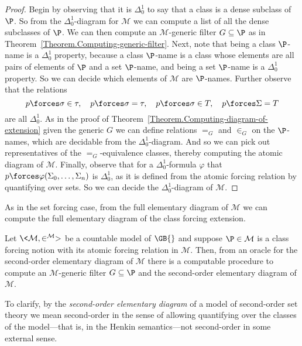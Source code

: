\documentclass{amsart}
\begin{document}
 \begin{proof}
   Begin by observing that it is $\Delta^1_0$ to say that a class is a dense subclass of $\P$. So from the $\Delta^1_0$-diagram for $\mathcal M$ we can compute a list of all the dense subclasses of $\P$. We can then compute an $\mathcal M$-generic filter $G \subseteq \P$ as in Theorem~\ref{Theorem.Computing-generic-filter}. Next, note that being a class $\P$-name is a $\Delta^1_0$ property, because a class $\P$-name is a class whose elements are all pairs of elements of $\P$ and a set $\P$-name, and being a set $\P$-name is a $\Delta^1_0$ property. So we can decide which elements of $\mathcal M$ are $\P$-names. Further observe that the relations
 $$
 p \forces  \sigma \in \tau, \quad p \forces \sigma = \tau, \quad p \forces \sigma \in T, \quad p \forces \Sigma = T
 $$
 are all $\Delta^1_0$. As in the proof of Theorem~\ref{Theorem.Computing-diagram-of-extension} given the generic $G$ we can define relations $=_G$ and $\in_G$ on the $\P$-names, which are decidable from the $\Delta^1_0$-diagram. And so we can pick out representatives of the $=_G$-equivalence classes, thereby computing the atomic diagram of $\mathcal M$. Finally, observe that for a $\Delta^1_0$-formula $\varphi$ that $p \forces \varphi(\Sigma_0, \ldots, \Sigma_n)$ is $\Delta^1_0$, as it is defined from the atomic forcing relation by quantifying over sets. So we can decide the $\Delta^1_0$-diagram of $\mathcal M$.
 \end{proof}
 
 As in the set forcing case, from the full elementary diagram of $\mathcal M$ we can compute the full elementary diagram of the class forcing extension.
 
 \begin{theorem}
 Let $\<\mathcal{M},\in^{\mathcal{M}}>$ be a countable model of $\GB{}$ and suppose $\P \in \mathcal M$ is a class forcing notion with its atomic forcing relation in $\mathcal M$. Then, from an oracle for the second-order elementary diagram of $\mathcal M$ there is a computable procedure to compute an $\mathcal M$-generic filter $G \subseteq \P$ and the second-order elementary diagram of $\mathcal{M}$. \end{theorem}
 
 To clarify, by the \emph{second-order elementary diagram} of a model of second-order set theory we mean second-order in the sense of allowing quantifying over the classes of the model---that is, in the Henkin semantics---not second-order in some external sense.
 
\end{document}
